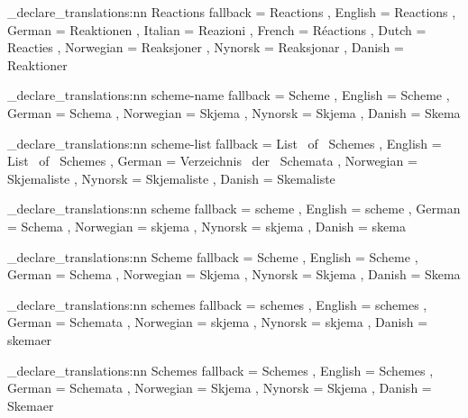 \chemmacros_declare_translations:nn {Reactions}
  {
    fallback  = Reactions ,
    English   = Reactions ,
    German    = Reaktionen ,
    Italian   = Reazioni ,
    French    = R\'{e}actions ,
    Dutch     = Reacties ,
    Norwegian = Reaksjoner ,
    Nynorsk   = Reaksjonar ,
    Danish    = Reaktioner
 }

\chemmacros_declare_translations:nn {scheme-name}
  {
    fallback  = Scheme ,
    English   = Scheme ,
    German    = Schema ,
    Norwegian = Skjema ,
    Nynorsk   = Skjema ,
    Danish    = Skema
  }

\chemmacros_declare_translations:nn {scheme-list}
  {
    fallback  = List~ of~ Schemes ,
    English   = List~ of~ Schemes ,
    German    = Verzeichnis~ der~ Schemata ,
    Norwegian = Skjemaliste ,
    Nynorsk   = Skjemaliste ,
    Danish    = Skemaliste
  }

\chemmacros_declare_translations:nn {scheme}
  {
    fallback  = scheme ,
    English   = scheme ,
    German    = Schema ,
    Norwegian = skjema ,
    Nynorsk   = skjema ,
    Danish    = skema
  }

\chemmacros_declare_translations:nn {Scheme}
  {
    fallback  = Scheme ,
    English   = Scheme ,
    German    = Schema ,
    Norwegian = Skjema ,
    Nynorsk   = Skjema ,
    Danish    = Skema
  }

\chemmacros_declare_translations:nn {schemes}
  {
    fallback  = schemes ,
    English   = schemes ,
    German    = Schemata ,
    Norwegian = skjema ,
    Nynorsk   = skjema ,
    Danish    = skemaer
  }

\chemmacros_declare_translations:nn {Schemes}
  {
    fallback  = Schemes ,
    English   = Schemes ,
    German    = Schemata ,
    Norwegian = Skjema ,
    Nynorsk   = Skjema ,
    Danish    = Skemaer
  }

\ChemModuleEnd
